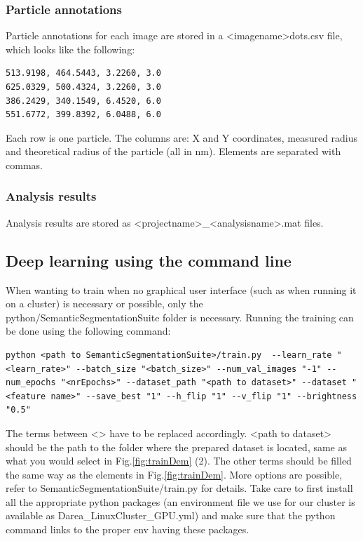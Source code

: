 \documentclass[12pt, a4paper]{scrartcl}
\begin{document}
\subsubsection{Particle annotations}
Particle annotations for each image are stored in a <imagename>dots.csv file, which looks like the following:
\begin{lstlisting}[belowskip=0pt]
513.9198, 464.5443, 3.2260, 3.0
625.0329, 500.4324, 3.2260, 3.0
386.2429, 340.1549, 6.4520, 6.0
551.6772, 399.8392, 6.0488, 6.0
\end{lstlisting}
Each row is one particle. The columns are: X and Y coordinates, measured radius and theoretical radius of the particle (all in nm). Elements are separated with commas.
\subsubsection{Analysis results}
Analysis results are stored as <projectname>\_<analysisname>.mat files.
\subsection{Deep learning using the command line}
When wanting to train when no graphical user interface (such as when running it on a cluster) is necessary or possible, only the python/SemanticSegmentationSuite folder is necessary.
Running the training can be done using the following command:
\begin{lstlisting}[belowskip=0pt,breaklines=true]
python <path to SemanticSegmentationSuite>/train.py  --learn_rate "<learn_rate>" --batch_size "<batch_size>" --num_val_images "-1" --num_epochs "<nrEpochs>" --dataset_path "<path to dataset>" --dataset "<feature name>" --save_best "1" --h_flip "1" --v_flip "1" --brightness "0.5" 
\end{lstlisting}
The terms between <> have to be replaced accordingly. <path to dataset> should be the path to the folder where the prepared dataset is located, same as what you would select in Fig.\ref{fig:trainDem} (2). The other terms should be filled the same way as the elements in Fig.\ref{fig:trainDem}. More options are possible, refer to SemanticSegmentationSuite/train.py for details. 
Take care to first install all the appropriate python packages (an environment file we use for our cluster is available as Darea\_LinuxCluster\_GPU.yml) and make sure that the python command links to the proper env having these packages.
\end{document}
